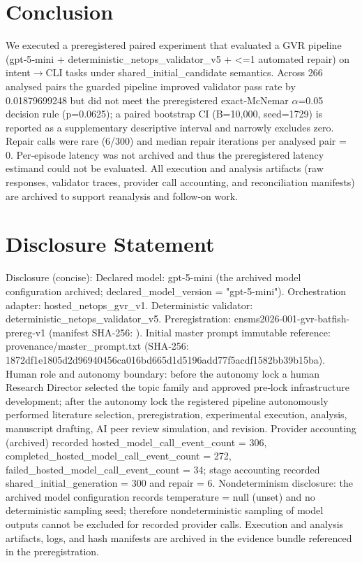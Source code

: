 \documentclass[conference]{IEEEtran}
\begin{document}
\section{Conclusion}
We executed a preregistered paired experiment that evaluated a GVR pipeline (gpt‑5‑mini + deterministic\_netops\_validator\_v5 + <=1 automated repair) on intent\ensuremath{\rightarrow}CLI tasks under shared\_initial\_candidate semantics. Across 266 analysed pairs the guarded pipeline improved validator pass rate by 0.01879699248 but did not meet the preregistered exact‑McNemar \ensuremath{\alpha}=0.05 decision rule (p=0.0625); a paired bootstrap CI (B=10,000, seed=1729) is reported as a supplementary descriptive interval and narrowly excludes zero. Repair calls were rare (6/300) and median repair iterations per analysed pair = 0. Per‑episode latency was not archived and thus the preregistered latency estimand could not be evaluated. All execution and analysis artifacts (raw responses, validator traces, provider call accounting, and reconciliation manifests) are archived to support reanalysis and follow‑on work.

\section*{Disclosure Statement}
Disclosure (concise): Declared model: gpt-5-mini (the archived model configuration archived; declared\_model\_version = "gpt-5-mini"). Orchestration adapter: hosted\_netops\_gvr\_v1. Deterministic validator: deterministic\_netops\_validator\_v5. Preregistration: cnsms2026-001-gvr-batfish-prereg-v1 (manifest SHA‑256: ). Initial master prompt immutable reference: provenance/master\_prompt.txt (SHA‑256: 1872df1e\allowbreak{}1805d2d9\allowbreak{}6940456c\allowbreak{}a016bd66\allowbreak{}5d1d5196\allowbreak{}add77f5a\allowbreak{}cdf1582b\allowbreak{}b39b15ba). Human role and autonomy boundary: before the autonomy lock a human Research Director selected the topic family and approved pre‑lock infrastructure development; after the autonomy lock the registered pipeline autonomously performed literature selection, preregistration, experimental execution, analysis, manuscript drafting, AI peer review simulation, and revision. Provider accounting (archived) recorded hosted\_model\_call\_event\_count = 306, completed\_hosted\_model\_call\_event\_count = 272, failed\_hosted\_model\_call\_event\_count = 34; stage accounting recorded shared\_initial\_generation = 300 and repair = 6. Nondeterminism disclosure: the archived model configuration records temperature = null (unset) and no deterministic sampling seed; therefore nondeterministic sampling of model outputs cannot be excluded for recorded provider calls. Execution and analysis artifacts, logs, and hash manifests are archived in the evidence bundle referenced in the preregistration.
\end{document}
